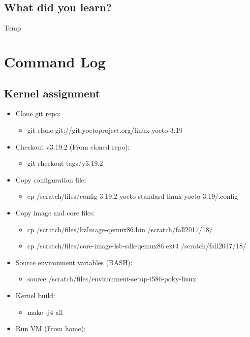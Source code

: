 \documentclass[a4paper]{article}
\begin{document}
\subsection{What did you learn?}
Temp

\section{Command Log}
\subsection{Kernel assignment}
\begin{itemize}
  \item Clone git repo: 
    \begin{itemize}
      \item git clone git://git.yoctoproject.org/linux-yocto-3.19
    \end{itemize}
    \item Checkout v3.19.2 (From cloned repo): 
    \begin{itemize}
      \item git checkout tags/v3.19.2
    \end{itemize}
    \item Copy configuration file: 
    \begin{itemize}
      \item cp /scratch/files/config-3.19.2-yocto-standard linux-yocto-3.19/.config
    \end{itemize}
    \item Copy image and core files: 
    \begin{itemize}
      \item cp /scratch/files/bzImage-qemux86.bin /scratch/fall2017/18/
        \item cp /scratch/files/core-image-lsb-sdk-qemux86.ext4  /scratch/fall2017/18/
    \end{itemize}
    \item Source environment variables (BASH):
        \begin{itemize}
          \item source /scratch/files/environment-setup-i586-poky-linux
        \end{itemize}
        \item Kernel build: 
        \begin{itemize}
          \item make -j4 all
        \end{itemize}
        \item Run VM (From home): 

\end{itemize}
\end{document}
